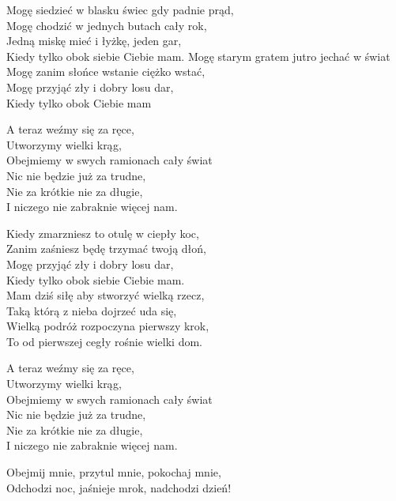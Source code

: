 \begin{text}
    Mogę siedzieć w blasku świec gdy padnie prąd,\\
    Mogę chodzić w jednych butach cały rok,\\
    Jedną miskę mieć i łyżkę, jeden gar,\\
    Kiedy tylko obok siebie Ciebie mam.
    Mogę starym gratem jutro jechać w świat\\
    Mogę zanim słońce wstanie ciężko wstać,\\
    Mogę przyjąć zły i dobry losu dar,\\
    Kiedy tylko obok Ciebie mam

    \vin A teraz weźmy się za ręce,\\
    \vin Utworzymy wielki krąg,\\
    \vin Obejmiemy w swych ramionach cały świat\\
    \vin Nic nie będzie już za trudne,\\
    \vin Nie za krótkie nie za długie,\\
    \vin I niczego nie zabraknie więcej nam.

    Kiedy zmarzniesz to otulę w ciepły koc,\\
    Zanim zaśniesz będę trzymać twoją dłoń,\\
    Mogę przyjąć zły i dobry losu dar,\\
    Kiedy tylko obok siebie Ciebie mam.\\
    Mam dziś siłę aby stworzyć wielką rzecz,\\
    Taką którą z nieba dojrzeć uda się,\\
    Wielką podróż rozpoczyna pierwszy krok,\\
    To od pierwszej cegły rośnie wielki dom.

    \vin A teraz weźmy się za ręce,\\
    \vin Utworzymy wielki krąg,\\
    \vin Obejmiemy w swych ramionach cały świat\\
    \vin Nic nie będzie już za trudne,\\
    \vin Nie za krótkie nie za długie,\\
    \vin I niczego nie zabraknie więcej nam.

    Obejmij mnie, przytul mnie, pokochaj mnie,\\
    Odchodzi noc, jaśnieje mrok, nadchodzi dzień!\\


\end{text}
